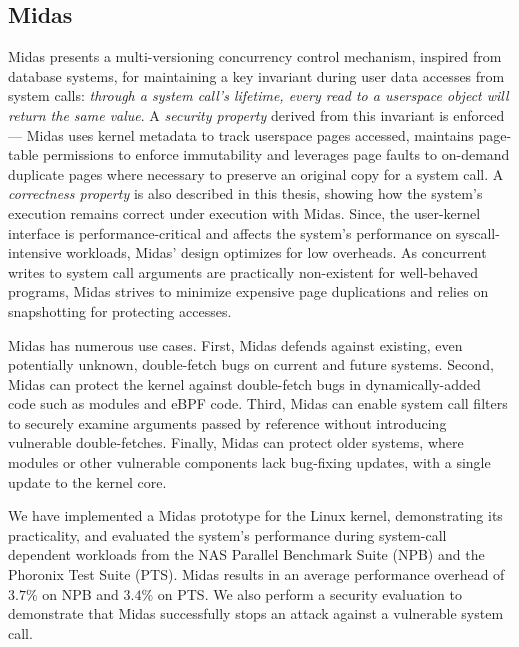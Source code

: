\subsection{Midas}
Midas presents a multi-versioning concurrency control mechanism, inspired
from database systems, for maintaining a key invariant during user data
accesses from system calls:
\emph{through a system call's lifetime, every read to a userspace object
will return the same value}.
A \emph{security property} derived from this invariant is enforced ---
Midas uses kernel metadata to track userspace pages accessed, maintains
page-table permissions to enforce immutability and leverages page faults
to on-demand duplicate pages where necessary to preserve an original
copy for a system call.
A \emph{correctness property} is also described in this thesis,
showing how the system's execution remains correct under execution with
Midas.
Since, the user-kernel interface is performance-critical and 
affects the system's performance on syscall-intensive workloads,
Midas' design optimizes for low overheads.
As concurrent writes to system call arguments are practically non-existent
for well-behaved programs, Midas strives to minimize expensive page 
duplications and relies on snapshotting for protecting accesses.

Midas has numerous use cases.
First, Midas defends against existing, even potentially unknown,
double-fetch bugs on current and future systems.
Second, Midas can protect the kernel against double-fetch bugs in
dynamically-added code such as modules and eBPF code.
Third, Midas can enable system call filters to securely examine 
arguments passed by reference without introducing
vulnerable double-fetches.
Finally, Midas can protect older systems, where modules or other
vulnerable components lack bug-fixing updates, with a single update 
to the kernel core.

We have implemented a Midas prototype for the Linux kernel, demonstrating its
practicality, and evaluated the system's performance during system-call
dependent workloads from the NAS Parallel Benchmark Suite (NPB) and the
Phoronix Test Suite (PTS).
Midas results in an average performance overhead of $3.7\%$ on NPB and
$3.4\%$ on PTS.
We also perform a security evaluation to demonstrate that Midas successfully
stops an attack against a vulnerable system call.

